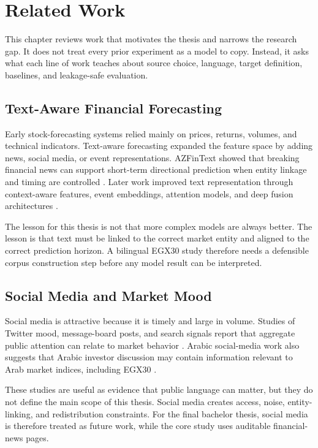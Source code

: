 \chapter{Related Work}
\label{chap:related}

This chapter reviews work that motivates the thesis and narrows the research gap. It does not treat every prior experiment as a model to copy. Instead, it asks what each line of work teaches about source choice, language, target definition, baselines, and leakage-safe evaluation.

\section{Text-Aware Financial Forecasting}

Early stock-forecasting systems relied mainly on prices, returns, volumes, and technical indicators. Text-aware forecasting expanded the feature space by adding news, social media, or event representations. AZFinText showed that breaking financial news can support short-term directional prediction when entity linkage and timing are controlled \cite{schumaker2009azfin}. Later work improved text representation through context-aware features, event embeddings, attention models, and deep fusion architectures \cite{hagenau2013automated, ding2015event, hu2018chaotic, xu2018stock}.

The lesson for this thesis is not that more complex models are always better. The lesson is that text must be linked to the correct market entity and aligned to the correct prediction horizon. A bilingual EGX30 study therefore needs a defensible corpus construction step before any model result can be interpreted.

\section{Social Media and Market Mood}

Social media is attractive because it is timely and large in volume. Studies of Twitter mood, message-board posts, and search signals report that aggregate public attention can relate to market behavior \cite{bollen2011twitter, nguyen2015social, mao2011predicting}. Arabic social-media work also suggests that Arabic investor discussion may contain information relevant to Arab market indices, including EGX30 \cite{alkhatib2016arabictweets}.

These studies are useful as evidence that public language can matter, but they do not define the main scope of this thesis. Social media creates access, noise, entity-linking, and redistribution constraints. For the final bachelor thesis, social media is therefore treated as future work, while the core study uses auditable financial-news pages.

